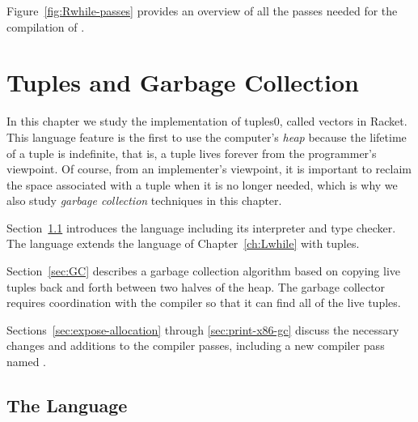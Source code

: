 \documentclass[7x10,nocrop]{TimesAPriori_MIT}%
\def\racketEd{0}
\def\edition{1}
\newcommand{\racket}[1]{{\if\edition\racketEd{#1}\fi}}
\begin{document}
Figure~\ref{fig:Rwhile-passes} provides an overview of all the passes needed
for the compilation of \LangLoop{}.






\chapter{Tuples and Garbage Collection}
\label{ch:Lvec}


In this chapter we study the implementation of
tuples\racket{, called vectors in Racket}.
%
This language feature is the first to use the computer's
\emph{heap} because the lifetime of a tuple is
indefinite, that is, a tuple lives forever from the programmer's
viewpoint. Of course, from an implementer's viewpoint, it is important
to reclaim the space associated with a tuple when it is no longer
needed, which is why we also study \emph{garbage collection}
 techniques in this chapter.

Section~\ref{sec:r3} introduces the \LangVec{} language including its
interpreter and type checker. The \LangVec{} language extends the \LangLoop{}
language of Chapter~\ref{ch:Lwhile} with tuples.

Section~\ref{sec:GC} describes a garbage collection algorithm based on
copying live tuples back and forth between two halves of the heap. The
garbage collector requires coordination with the compiler so that it
can find all of the live tuples.

Sections~\ref{sec:expose-allocation} through \ref{sec:print-x86-gc}
discuss the necessary changes and additions to the compiler passes,
including a new compiler pass named .

\section{The \LangVec{} Language}
\label{sec:r3}
\end{document}
